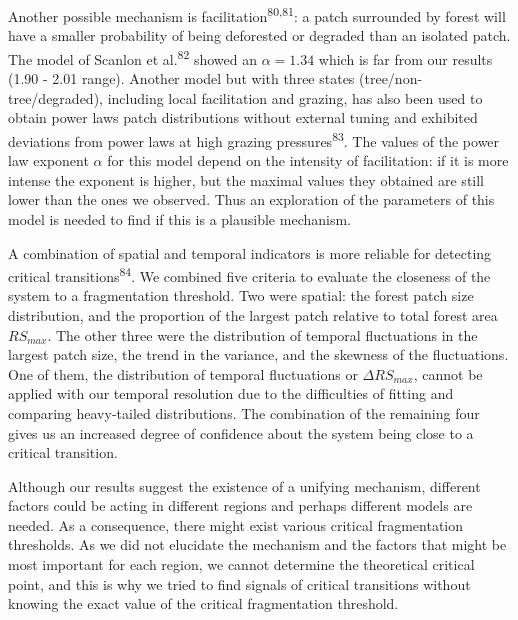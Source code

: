 \documentclass[]{article}
\begin{document}
Another possible mechanism is facilitation\textsuperscript{80,81}: a
patch surrounded by forest will have a smaller probability of being
deforested or degraded than an isolated patch. The model of Scanlon et
al.\textsuperscript{82} showed an \(\alpha=1.34\) which is far from our
results (1.90 - 2.01 range). Another model but with three states
(tree/non-tree/degraded), including local facilitation and grazing, has
also been used to obtain power laws patch distributions without external
tuning and exhibited deviations from power laws at high grazing
pressures\textsuperscript{83}. The values of the power law exponent
\(\alpha\) for this model depend on the intensity of facilitation: if it
is more intense the exponent is higher, but the maximal values they
obtained are still lower than the ones we observed. Thus an exploration
of the parameters of this model is needed to find if this is a plausible
mechanism.

A combination of spatial and temporal indicators is more reliable for
detecting critical transitions\textsuperscript{84}. We combined five
criteria to evaluate the closeness of the system to a fragmentation
threshold. Two were spatial: the forest patch size distribution, and the
proportion of the largest patch relative to total forest area
\(RS_{max}\). The other three were the distribution of temporal
fluctuations in the largest patch size, the trend in the variance, and
the skewness of the fluctuations. One of them, the distribution of
temporal fluctuations or \(\Delta RS_{max}\), cannot be applied with our
temporal resolution due to the difficulties of fitting and comparing
heavy-tailed distributions. The combination of the remaining four gives
us an increased degree of confidence about the system being close to a
critical transition.

Although our results suggest the existence of a unifying mechanism,
different factors could be acting in different regions and perhaps
different models are needed. As a consequence, there might exist various
critical fragmentation thresholds. As we did not elucidate the mechanism
and the factors that might be most important for each region, we cannot
determine the theoretical critical point, and this is why we tried to
find signals of critical transitions without knowing the exact value of
the critical fragmentation threshold.
\end{document}
